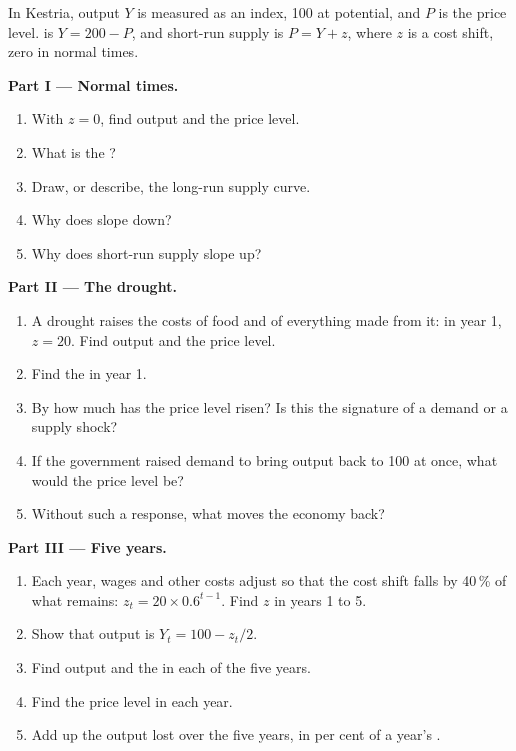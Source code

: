 \begin{problem}
\label{pb:g12:aggregate-demand-and-supply:1}
In Kestria, output $Y$ is measured as an index, 100 at potential, and $P$ is the price level.  is $Y = 200 - P$, and short-run supply is $P = Y + z$, where
$z$ is a cost shift, zero in normal times.

\medskip
\noindent\textbf{Part I --- Normal times.}
\begin{enumerate}
\item With $z = 0$, find output and the price level.
\item What is the ?
\item Draw, or describe, the long-run supply curve.
\item Why does  slope down?
\item Why does short-run supply slope up?
\end{enumerate}

\medskip
\noindent\textbf{Part II --- The drought.}
\begin{enumerate}[resume]
\item A drought raises the costs of food and of everything made from it: in year 1, $z = 20$. Find output and the price level.
\item Find the  in year 1.
\item By how much has the price level risen? Is this the signature of a demand or a supply shock?
\item If the government raised demand to bring output back to 100 at once, what would the price level be?
\item Without such a response, what moves the economy back?
\end{enumerate}

\medskip
\noindent\textbf{Part III --- Five years.}
\begin{enumerate}[resume]
\item Each year, wages and other costs adjust so that the cost shift falls by 40\,\% of what remains: $z_t = 20 \times 0.6^{t-1}$. Find $z$ in years 1 to 5.
\item Show that output is $Y_t = 100 - z_t/2$.
\item Find output and the  in each of the five years.
\item Find the price level in each year.
\item Add up the output lost over the five years, in per cent of a year's .
\end{enumerate}


\end{problem}
